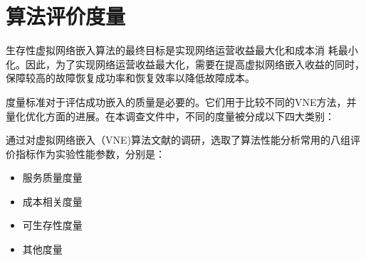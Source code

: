 \section{算法评价度量}
生存性虚拟网络嵌入算法的最终目标是实现网络运营收益最大化和成本消 耗最小化。因此，为了实现网络运营收益最大化，需要在提高虚拟网络嵌入收益的同时，保障较高的故障恢复成功率和恢复效率以降低故障成本。

度量标准对于评估成功嵌入的质量是必要的。它们用于比较不同的VNE方法，并量化优化方面的进展。在本调查文件中，不同的度量被分成以下四大类别：

通过对虚拟网络嵌入（VNE)算法文献的调研，选取了算法性能分析常用的八组评价指标作为实验性能参数，分别是：
\begin{itemize}
  \item 服务质量度量
  \item 成本相关度量
  \item 可生存性度量
  \item 其他度量
\end{itemize}


